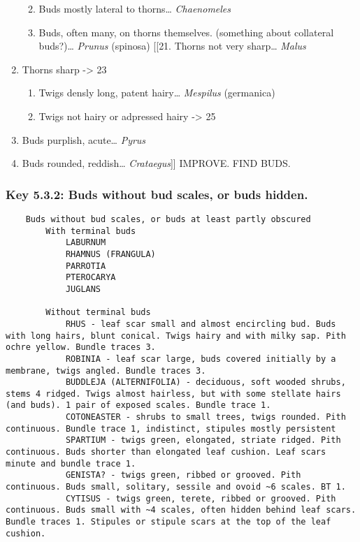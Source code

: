 \documentclass[openany]{book}
\providecommand{\tightlist}{%
  \setlength{\itemsep}{0pt}\setlength{\parskip}{0pt}}
\begin{document}
\begin{enumerate}
  \begin{enumerate}
  \def\labelenumii{\arabic{enumii}.}
  \setcounter{enumii}{18}
  \tightlist
  \item
    Buds mostly lateral to thorns\ldots{} \emph{Chaenomeles}
  \item
    Buds, often many, on thorns themselves. (something about collateral
    buds?)\ldots{} \emph{Prunus} (spinosa) {[}{[}21. Thorns not very
    sharp\ldots{} \emph{Malus}
  \end{enumerate}
\item
  Thorns sharp -\textgreater{} 23

  \begin{enumerate}
  \def\labelenumii{\arabic{enumii}.}
  \setcounter{enumii}{22}
  \tightlist
  \item
    Twigs densly long, patent hairy\ldots{} \emph{Mespilus} (germanica)
  \item
    Twigs not hairy or adpressed hairy -\textgreater{} 25
  \end{enumerate}
\item
  Buds purplish, acute\ldots{} \emph{Pyrus}
\item
  Buds rounded, reddish\ldots{} \emph{Crataegus}{]}{]} IMPROVE. FIND
  BUDS.
\end{enumerate}

\hypertarget{key-5.3.2-buds-without-bud-scales-or-buds-hidden.}{%
\subsubsection{Key 5.3.2: Buds without bud scales, or buds
hidden.}\label{key-5.3.2-buds-without-bud-scales-or-buds-hidden.}}

\begin{verbatim}
    Buds without bud scales, or buds at least partly obscured
        With terminal buds
            LABURNUM
            RHAMNUS (FRANGULA)
            PARROTIA 
            PTEROCARYA
            JUGLANS

        Without terminal buds
            RHUS - leaf scar small and almost encircling bud. Buds with long hairs, blunt conical. Twigs hairy and with milky sap. Pith ochre yellow. Bundle traces 3.
            ROBINIA - leaf scar large, buds covered initially by a membrane, twigs angled. Bundle traces 3.
            BUDDLEJA (ALTERNIFOLIA) - deciduous, soft wooded shrubs, stems 4 ridged. Twigs almost hairless, but with some stellate hairs (and buds). 1 pair of exposed scales. Bundle trace 1.
            COTONEASTER - shrubs to small trees, twigs rounded. Pith continuous. Bundle trace 1, indistinct, stipules mostly persistent
            SPARTIUM - twigs green, elongated, striate ridged. Pith continuous. Buds shorter than elongated leaf cushion. Leaf scars minute and bundle trace 1.
            GENISTA? - twigs green, ribbed or grooved. Pith continuous. Buds small, solitary, sessile and ovoid ~6 scales. BT 1.
            CYTISUS - twigs green, terete, ribbed or grooved. Pith continuous. Buds small with ~4 scales, often hidden behind leaf scars. Bundle traces 1. Stipules or stipule scars at the top of the leaf cushion.
\end{verbatim}
\end{document}
